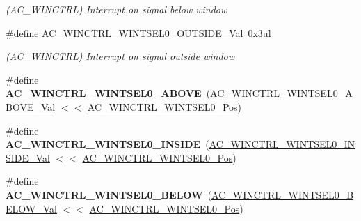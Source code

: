 \begin{DoxyCompactItemize}
\begin{DoxyCompactList}\small\item\em (A\+C\+\_\+\+W\+I\+N\+C\+T\+R\+L) Interrupt on signal below window \end{DoxyCompactList}\item 
\hypertarget{group___s_a_m_l21___a_c_ga75d730dac04d0f2fdf146b55d1fe4b7f}{}\#define \hyperlink{group___s_a_m_l21___a_c_ga75d730dac04d0f2fdf146b55d1fe4b7f}{A\+C\+\_\+\+W\+I\+N\+C\+T\+R\+L\+\_\+\+W\+I\+N\+T\+S\+E\+L0\+\_\+\+O\+U\+T\+S\+I\+D\+E\+\_\+\+Val}~0x3ul\label{group___s_a_m_l21___a_c_ga75d730dac04d0f2fdf146b55d1fe4b7f}

\begin{DoxyCompactList}\small\item\em (A\+C\+\_\+\+W\+I\+N\+C\+T\+R\+L) Interrupt on signal outside window \end{DoxyCompactList}\item 
\hypertarget{group___s_a_m_l21___a_c_ga94f499f5e9487b3be0709b7ec7bcd860}{}\#define {\bfseries A\+C\+\_\+\+W\+I\+N\+C\+T\+R\+L\+\_\+\+W\+I\+N\+T\+S\+E\+L0\+\_\+\+A\+B\+O\+V\+E}~(\hyperlink{group___s_a_m_l21___a_c_ga4e693526712b2cfcabdab157f1f8be71}{A\+C\+\_\+\+W\+I\+N\+C\+T\+R\+L\+\_\+\+W\+I\+N\+T\+S\+E\+L0\+\_\+\+A\+B\+O\+V\+E\+\_\+\+Val} $<$$<$ \hyperlink{group___s_a_m_l21___a_c_gaf7bc05aa7122fff6ea05ae690cbc8486}{A\+C\+\_\+\+W\+I\+N\+C\+T\+R\+L\+\_\+\+W\+I\+N\+T\+S\+E\+L0\+\_\+\+Pos})\label{group___s_a_m_l21___a_c_ga94f499f5e9487b3be0709b7ec7bcd860}

\item 
\hypertarget{group___s_a_m_l21___a_c_gab5348a7bca6dc061b6c827acb25c9cf3}{}\#define {\bfseries A\+C\+\_\+\+W\+I\+N\+C\+T\+R\+L\+\_\+\+W\+I\+N\+T\+S\+E\+L0\+\_\+\+I\+N\+S\+I\+D\+E}~(\hyperlink{group___s_a_m_l21___a_c_ga68bafe85eeb71ce0ce83d48a51cb95f6}{A\+C\+\_\+\+W\+I\+N\+C\+T\+R\+L\+\_\+\+W\+I\+N\+T\+S\+E\+L0\+\_\+\+I\+N\+S\+I\+D\+E\+\_\+\+Val} $<$$<$ \hyperlink{group___s_a_m_l21___a_c_gaf7bc05aa7122fff6ea05ae690cbc8486}{A\+C\+\_\+\+W\+I\+N\+C\+T\+R\+L\+\_\+\+W\+I\+N\+T\+S\+E\+L0\+\_\+\+Pos})\label{group___s_a_m_l21___a_c_gab5348a7bca6dc061b6c827acb25c9cf3}

\item 
\hypertarget{group___s_a_m_l21___a_c_ga6b64dbedae3525bbcbf2da4c53a8a2c7}{}\#define {\bfseries A\+C\+\_\+\+W\+I\+N\+C\+T\+R\+L\+\_\+\+W\+I\+N\+T\+S\+E\+L0\+\_\+\+B\+E\+L\+O\+W}~(\hyperlink{group___s_a_m_l21___a_c_gab989630a135aae7f20d8d1161fae744a}{A\+C\+\_\+\+W\+I\+N\+C\+T\+R\+L\+\_\+\+W\+I\+N\+T\+S\+E\+L0\+\_\+\+B\+E\+L\+O\+W\+\_\+\+Val} $<$$<$ \hyperlink{group___s_a_m_l21___a_c_gaf7bc05aa7122fff6ea05ae690cbc8486}{A\+C\+\_\+\+W\+I\+N\+C\+T\+R\+L\+\_\+\+W\+I\+N\+T\+S\+E\+L0\+\_\+\+Pos})\label{group___s_a_m_l21___a_c_ga6b64dbedae3525bbcbf2da4c53a8a2c7}


\end{DoxyCompactItemize}
